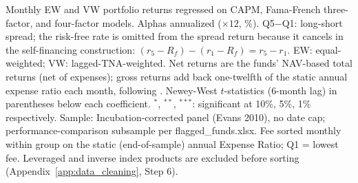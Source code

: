 \begin{table}[!htbp]
\begin{minipage}{\tabletempwidth}
\begin{singlespace}
Monthly EW and VW portfolio returns regressed on CAPM, Fama-French three-factor, and \textcite{Carhart1997} four-factor models. Alphas annualized ($\times 12$, \%). Q5$-$Q1: long-short spread; the risk-free rate is omitted from the spread return because it cancels in the self-financing construction: $(r_5 - R_f) - (r_1 - R_f) = r_5 - r_1$. EW: equal-weighted; VW: lagged-TNA-weighted. Net returns are the funds' NAV-based total returns (net of expenses); gross returns add back one-twelfth of the static annual expense ratio each month, following \textcite{FamaFrench2010}. Newey-West $t$-statistics (6-month lag) in parentheses below each coefficient. $^{*}$, $^{**}$, $^{***}$: significant at 10\%, 5\%, 1\% respectively. Sample: Incubation-corrected panel (Evans 2010), no date cap; performance-comparison subsample per flagged\_funds.xlsx. Fee sorted monthly within group on the static (end-of-sample) annual Expense Ratio; Q1 = lowest fee. Leveraged and inverse index products are excluded before sorting (Appendix~\ref{app:data_cleaning}, Step 6).
\end{singlespace}
\end{minipage}
\end{table}

